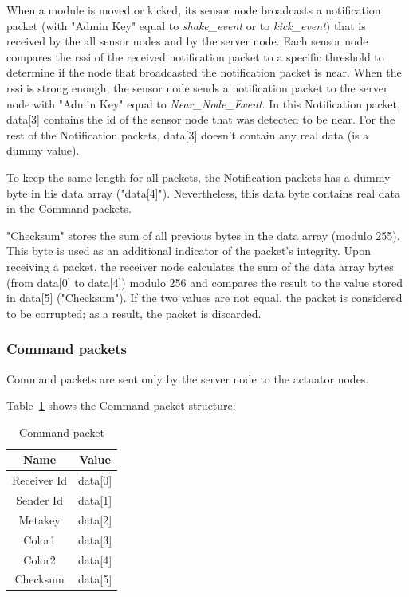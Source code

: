 When a module is moved or kicked, its sensor node broadcasts a notification packet (with "Admin Key" equal to \emph{shake\_event} or to \emph{kick\_event}) that is received by the all sensor nodes and by the server node. Each sensor node compares the rssi of the received notification packet to a specific threshold to determine if the node that broadcasted the notification packet is near. When the rssi is strong enough, the sensor node sends a notification packet to the server node with "Admin Key" equal to \emph{Near\_Node\_Event}. In this Notification packet, data[3] contains the id of the sensor node that was detected to be near. For the rest of the Notification packets, data[3] doesn't contain any real data (is a dummy value). 

To keep the same length for all packets, the Notification packets has a dummy byte in his data array ("data[4]"). Nevertheless, this data byte contains real data in the Command packets. 

"Checksum" stores the sum of all previous bytes in the data array (modulo 255). This byte is used as an additional indicator of the packet's integrity. Upon receiving a packet, the receiver node calculates the sum of the data array bytes (from data[0] to data[4]) modulo 256 and compares the result to the value stored in data[5] ("Checksum"). If the two values are not equal, the packet is considered to be corrupted; as a result, the packet is discarded.

\subsubsection{Command packets}
Command packets are sent only by the server node to the actuator nodes. 	

Table~\ref{Command-packet} shows the Command packet structure: 

\begin{table}[h]
  \centering
  \begin{tabular}{ c | c }
    \hline
    \textbf{Name} & \textbf{Value}\\ [0.5ex]    
    \hline
    Receiver Id & data[0] \\
    Sender Id & data[1] \\
    Metakey & data[2]\\
    Color1  & data[3]\\
    Color2 & data[4]\\ 
    Checksum & data[5]\\		 
    \hline
  \end{tabular}
  \caption[Command packet]%
          {Command packet}
  \label{Command-packet}
\end{table}

